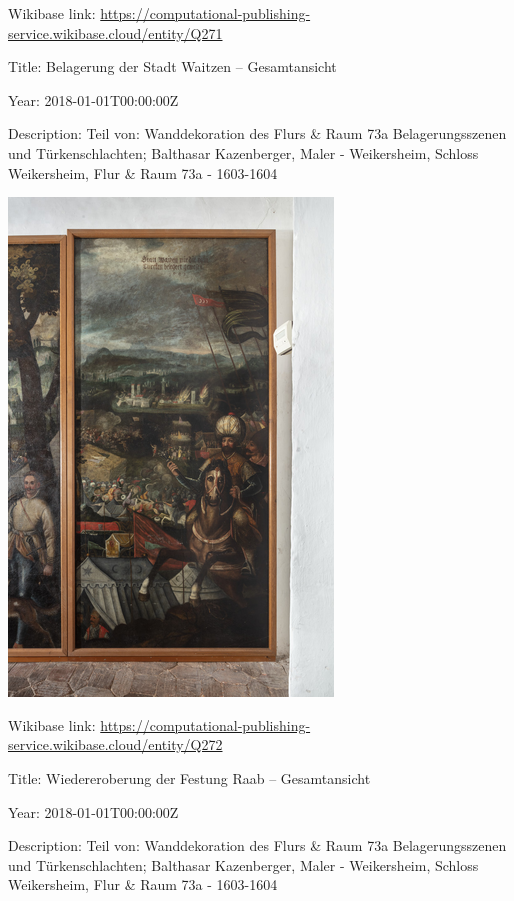 \documentclass[
  letterpaper,
]{book}
\begin{document}
Wikibase link:
\url{https://computational-publishing-service.wikibase.cloud/entity/Q271}

Title: Belagerung der Stadt Waitzen -- Gesamtansicht

Year: 2018-01-01T00:00:00Z

Description: Teil von: Wanddekoration des Flurs \& Raum 73a
Belagerungsszenen und Türkenschlachten; Balthasar Kazenberger, Maler -
Weikersheim, Schloss Weikersheim, Flur \& Raum 73a - 1603-1604

\includegraphics{paintings_files/figure-pdf/cell-3-output-92.png}

Wikibase link:
\url{https://computational-publishing-service.wikibase.cloud/entity/Q272}

Title: Wiedereroberung der Festung Raab -- Gesamtansicht

Year: 2018-01-01T00:00:00Z

Description: Teil von: Wanddekoration des Flurs \& Raum 73a
Belagerungsszenen und Türkenschlachten; Balthasar Kazenberger, Maler -
Weikersheim, Schloss Weikersheim, Flur \& Raum 73a - 1603-1604
\end{document}
